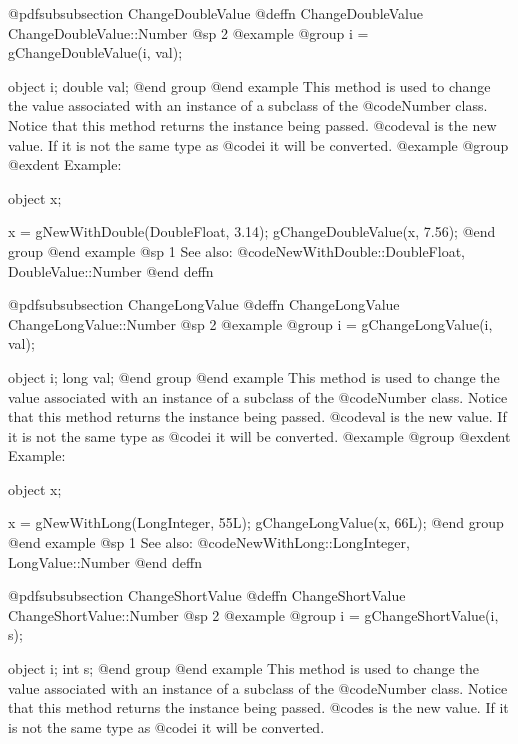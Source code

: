 @pdfsubsubsection {ChangeDoubleValue}
@deffn {ChangeDoubleValue} ChangeDoubleValue::Number
@sp 2
@example
@group
i = gChangeDoubleValue(i, val);

object  i;
double  val;
@end group
@end example
This method is used to change the value associated with an instance of
a subclass of the @code{Number} class.  Notice that this method
returns the instance being passed.  @code{val} is the new value.
If it is not the same type as @code{i} it will be converted.
@example
@group
@exdent Example:

object  x;

x = gNewWithDouble(DoubleFloat, 3.14);
gChangeDoubleValue(x, 7.56);
@end group
@end example
@sp 1
See also:  @code{NewWithDouble::DoubleFloat, DoubleValue::Number}
@end deffn














@pdfsubsubsection {ChangeLongValue}
@deffn {ChangeLongValue} ChangeLongValue::Number
@sp 2
@example
@group
i = gChangeLongValue(i, val);

object  i;
long    val;
@end group
@end example
This method is used to change the value associated with an instance of
a subclass of the @code{Number} class.  Notice that this method
returns the instance being passed.  @code{val} is the new value.
If it is not the same type as @code{i} it will be converted.
@example
@group
@exdent Example:

object  x;

x = gNewWithLong(LongInteger, 55L);
gChangeLongValue(x, 66L);
@end group
@end example
@sp 1
See also:  @code{NewWithLong::LongInteger, LongValue::Number}
@end deffn










@pdfsubsubsection {ChangeShortValue}
@deffn {ChangeShortValue} ChangeShortValue::Number
@sp 2
@example
@group
i = gChangeShortValue(i, s);

object  i;
int     s;
@end group
@end example
This method is used to change the value associated with an instance of
a subclass of the @code{Number} class.  Notice that this method
returns the instance being passed.  @code{s} is the new value.
If it is not the same type as @code{i} it will be converted.

